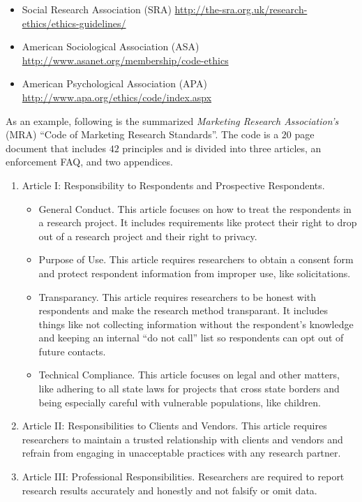 \begin{itemize}
	\item Social Research Association (SRA) \url{http://the-sra.org.uk/research-ethics/ethics-guidelines/}
	\item American Sociological Association (ASA) \url{http://www.asanet.org/membership/code-ethics}
	\item American Psychological Association (APA) \url{http://www.apa.org/ethics/code/index.aspx}
\end{itemize}

As an example, following is the summarized \textit{Marketing Research Association's} (MRA) ``Code of Marketing Research Standards''\cite{mra2018standards}. The code is a $ 20 $ page document that includes $ 42 $ principles and is divided into three articles, an enforcement FAQ, and two appendices.

\begin{enumerate}
	\item Article I: Responsibility to Respondents and Prospective Respondents. 
	
	\begin{itemize}
		\item General Conduct. This article focuses on how to treat the respondents in a research project. It includes requirements like protect their right to drop out of a research project and their right to privacy.
		\item Purpose of Use. This article requires researchers to obtain a consent form and protect respondent information from improper use, like solicitations.
		\item Transparancy. This article requires researchers to be honest with respondents and make the research method transparant. It includes things like not collecting information without the respondent's knowledge and keeping an internal ``do not call'' list so respondents can opt out of future contacts.
		\item Technical Compliance. This article focuses on legal and other matters, like adhering to all state laws for projects that cross state borders and being especially careful with vulnerable populations, like children.
	\end{itemize}
	
	\item Article II: Responsibilities to Clients and Vendors. This article requires researchers to maintain a trusted relationship with clients and vendors and refrain from engaging in unacceptable practices with any research partner.
	
	\item Article III: Professional Responsibilities. Researchers are required to report research results accurately and honestly and not falsify or omit data.
	
\end{enumerate}

